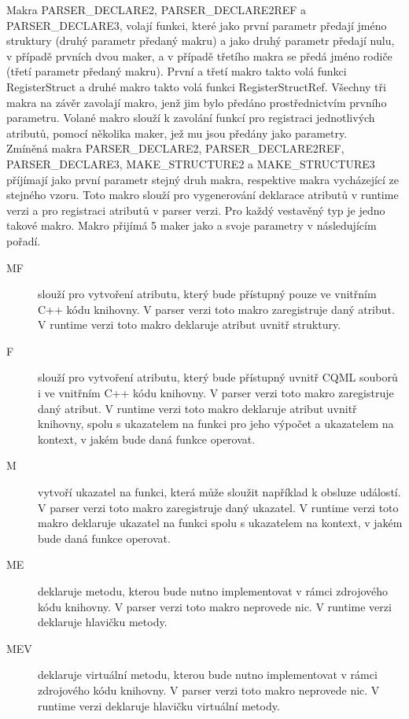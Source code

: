 \documentclass[report,11pt]{elsarticle}
\begin{document}
Makra PARSER\_DECLARE2, PARSER\_DECLARE2REF a PARSER\_DECLARE3, volají funkci, které jako první parametr předají jméno struktury (druhý parametr předaný makru) a jako druhý parametr předají nulu, v případě prvních dvou maker, a v případě třetího makra se předá jméno rodiče (třetí parametr předaný makru). První a třetí makro takto volá funkci RegisterStruct a druhé makro takto volá funkci RegisterStructRef. Všechny tři makra na závěr zavolají makro, jenž jim bylo předáno prostřednictvím prvního parametru. Volané makro slouží k zavolání funkcí pro registraci jednotlivých atributů, pomocí několika maker, jež mu jsou předány jako parametry.\\

Zmíněná makra PARSER\_DECLARE2, PARSER\_DECLARE2REF, PARSER\_DECLARE3, MAKE\_STRUCTURE2 a MAKE\_STRUCTURE3 příjímají jako první parametr stejný druh makra, respektive makra vycházející ze stejného vzoru. Toto makro slouží pro vygenerování deklarace atributů v runtime verzi a pro registraci atributů v parser verzi. Pro každý vestavěný typ je jedno takové makro. Makro přijímá 5 maker jako a svoje parametry v následujícím pořadí.\\
\begin{description}
\item[MF] slouží pro vytvoření atributu, který bude přístupný pouze ve vnitřním C++ kódu knihovny. V parser verzi toto makro zaregistruje daný atribut. V runtime verzi toto makro deklaruje atribut uvnitř struktury.
\item[F] slouží pro vytvoření atributu, který bude přístupný uvnitř CQML souborů i ve vnitřním C++ kódu knihovny. V parser verzi toto makro zaregistruje daný atribut. V runtime verzi toto makro deklaruje atribut uvnitř knihovny, spolu s ukazatelem na funkci pro jeho výpočet a ukazatelem na kontext, v jakém bude daná funkce  operovat.
\item[M] vytvoří ukazatel na funkci, která může sloužit například k obsluze událostí. V parser verzi toto makro zaregistruje daný ukazatel. V runtime verzi toto makro deklaruje ukazatel na funkci spolu s ukazatelem na kontext, v jakém bude daná funkce operovat. 
\item[ME] deklaruje metodu, kterou bude nutno implementovat v rámci zdrojového kódu knihovny. V parser verzi toto makro neprovede nic. V runtime verzi deklaruje hlavičku metody.
\item[MEV] deklaruje virtuální metodu, kterou bude nutno implementovat v rámci zdrojového kódu knihovny. V parser verzi toto makro neprovede nic. V runtime verzi deklaruje hlavičku virtuální metody.
\end{description}
\end{document}
